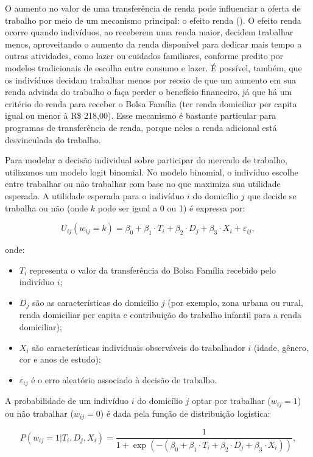\documentclass[12pt]{article}
\theoremstyle{break}
\begin{document}
O aumento no valor de uma transferência de renda pode influenciar a oferta de trabalho por meio de um mecanismo principal: o efeito renda (\cite{kaufman2006economics}). O efeito renda ocorre quando indivíduos, ao receberem uma renda maior, decidem trabalhar menos, aproveitando o aumento da renda disponível para dedicar mais tempo a outras atividades, como lazer ou cuidados familiares, conforme predito por modelos tradicionais de escolha entre consumo e lazer. É possível, também, que os indivíduos decidam trabalhar menos por receio de que um aumento em sua renda advinda do trabalho o faça perder o benefício financeiro, já que há um critério de renda para receber o Bolsa Família (ter renda domiciliar per capita igual ou menor à R\$ 218,00). Esse mecanismo é bastante particular para programas de transferência de renda, porque neles a renda adicional está desvinculada do trabalho. 

Para modelar a decisão individual sobre participar do mercado de trabalho, utilizamos um modelo logit binomial. No modelo binomial, o indivíduo escolhe entre trabalhar ou não trabalhar com base no que maximiza sua utilidade esperada. A utilidade esperada para o indivíduo \(i\) do domicílio \(j\) que decide se trabalha ou não (onde \(k\) pode ser igual a 0 ou 1) é expressa por:

\[
U_{ij}(w_{ij} = k) = \beta_0 + \beta_1 \cdot T_i + \beta_2 \cdot D_j + \beta_3 \cdot X_i + \varepsilon_{ij},
\]

onde:  
\begin{itemize}
    \item \(T_i\) representa o valor da transferência do Bolsa Família recebido pelo indivíduo \(i\);
    \item \(D_j\) são as características do domicílio \(j\) (por exemplo, zona urbana ou rural, renda domiciliar per capita e contribuição do trabalho infantil para a renda domiciliar);
    \item \(X_i\) são características individuais observáveis do trabalhador \(i\) (idade, gênero, cor e anos de estudo);
    \item \(\varepsilon_{ij}\) é o erro aleatório associado à decisão de trabalho.
\end{itemize}

A probabilidade de um indivíduo \(i\) do domicílio \(j\) optar por trabalhar (\(w_{ij} = 1\)) ou não trabalhar (\(w_{ij} = 0\)) é dada pela função de distribuição logística:

\[
P(w_{ij} = 1 | T_i, D_j, X_i) = \frac{1}{1 + \exp\left( -\left( \beta_0 + \beta_1 \cdot T_i + \beta_2 \cdot D_j + \beta_3 \cdot X_i \right) \right)},
\]
\end{document}
